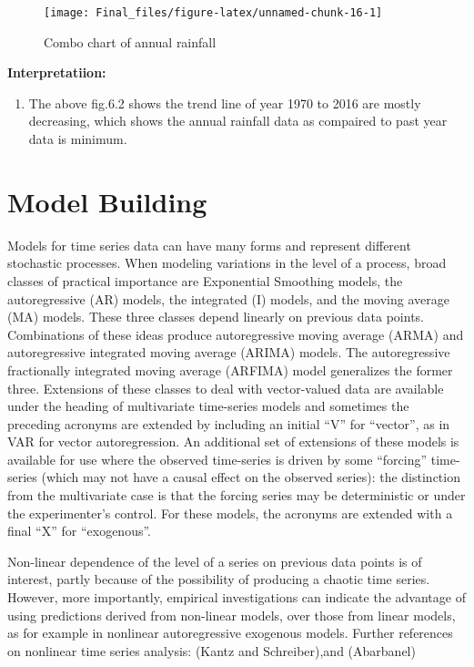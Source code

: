 \documentclass[12pt,openany]{book}
\providecommand{\tightlist}{%
  \setlength{\itemsep}{0pt}\setlength{\parskip}{0pt}}
\begin{document}
\begin{figure}

{\centering \texttt{[image: Final\_files/figure-latex/unnamed-chunk-16-1]} 

}

\caption{Combo chart of annual rainfall}\label{fig:unnamed-chunk-16}
\end{figure}

\textbf{Interpretatiion:}

\begin{enumerate}
\def\labelenumi{\arabic{enumi}.}
\tightlist
\item
  The above fig.6.2 shows the trend line of year 1970 to 2016 are mostly decreasing, which shows the annual rainfall data as compaired to past year data is minimum.
\end{enumerate}

\hypertarget{model-building}{%
\section{Model Building}\label{model-building}}

Models for time series data can have many forms and represent different stochastic processes. When modeling variations in the level of a process, broad classes of practical importance are Exponential Smoothing models, the autoregressive (AR) models, the integrated (I) models, and the moving average (MA) models. These three classes depend linearly on previous data points. Combinations of these ideas produce autoregressive moving average (ARMA) and autoregressive integrated moving average (ARIMA) models. The autoregressive fractionally integrated moving average (ARFIMA) model generalizes the former three. Extensions of these classes to deal with vector-valued data are available under the heading of multivariate time-series models and sometimes the preceding acronyms are extended by including an initial ``V'' for ``vector'', as in VAR for vector autoregression. An additional set of extensions of these models is available for use where the observed time-series is driven by some ``forcing'' time-series (which may not have a causal effect on the observed series): the distinction from the multivariate case is that the forcing series may be deterministic or under the experimenter's control. For these models, the acronyms are extended with a final ``X'' for ``exogenous''.

Non-linear dependence of the level of a series on previous data points is of interest, partly because of the possibility of producing a chaotic time series. However, more importantly, empirical investigations can indicate the advantage of using predictions derived from non-linear models, over those from linear models, as for example in nonlinear autoregressive exogenous models. Further references on nonlinear time series analysis: (Kantz and Schreiber),and (Abarbanel)
\end{document}
